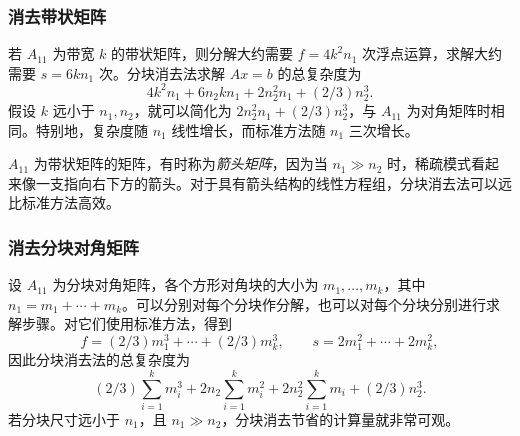 \subsubsection*{消去带状矩阵}
若 $A_{11}$ 为带宽 $k$ 的带状矩阵，则分解大约需要 $f=4k^2n_1$ 次浮点运算，求解大约需要 $s=6kn_1$ 次。分块消去法求解 $Ax=b$ 的总复杂度为
\[
 4k^2n_1+6n_2kn_1+2n_2^2n_1+(2/3)n_2^3.
\]
假设 $k$ 远小于 $n_1,n_2$，就可以简化为 $2n_2^2n_1+(2/3)n_2^3$，与 $A_{11}$ 为对角矩阵时相同。特别地，复杂度随 $n_1$ 线性增长，而标准方法随 $n_1$ 三次增长。

$A_{11}$ 为带状矩阵的矩阵，有时称为\emph{箭头矩阵}，因为当 $n_1\gg n_2$ 时，稀疏模式看起来像一支指向右下方的箭头。对于具有箭头结构的线性方程组，分块消去法可以远比标准方法高效。

\subsubsection*{消去分块对角矩阵}
设 $A_{11}$ 为分块对角矩阵，各个方形对角块的大小为 $m_1,\ldots,m_k$，其中 $n_1=m_1+\cdots+m_k$。可以分别对每个分块作分解，也可以对每个分块分别进行求解步骤。对它们使用标准方法，得到
\[
 f=(2/3)m_1^3+\cdots+(2/3)m_k^3,\qquad s=2m_1^2+\cdots+2m_k^2,
\]
因此分块消去法的总复杂度为
\[
 (2/3)\sum_{i=1}^k m_i^3+2n_2\sum_{i=1}^k m_i^2
 +2n_2^2\sum_{i=1}^k m_i+(2/3)n_2^3.
\]
若分块尺寸远小于 $n_1$，且 $n_1\gg n_2$，分块消去节省的计算量就非常可观。
